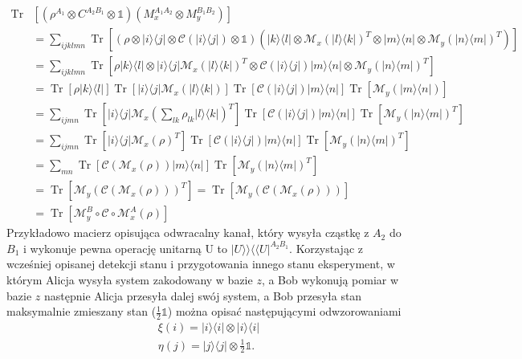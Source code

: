 \documentclass[10pt]{article} %
\DeclareMathOperator{\Trs}{Tr}
\newcommand{\Ket}[1]{|#1\rangle}
\newcommand{\Bra}[1]{\langle#1|}
\newcommand{\BBra}[1]{\langle\langle#1|}
\newcommand{\KKet}[1]{|#1\rangle\rangle}
\newcommand{\I}{\mathbb{1}}
\begin{document}
\begin{equation}
\begin{split}
\Trs&\left[ \left(\rho^{A_1} \otimes C^{A_2B_1} \otimes \I \right)\left(M_x^{A_1A_2}\otimes M_y^{B_1B_2}\right)\right] \\
&= \sum_{ijklmn} \Trs \left[ \left(\rho \otimes \Ket{i}\Bra{j} \otimes \mathcal{C}(\Ket{i}\Bra{j}) \otimes \I\right)\left(\Ket{k}\Bra{l} \otimes \mathcal{M}_x(\Ket{l}\Bra{k})^T \otimes \Ket{m}\Bra{n} \otimes \mathcal{M}_y(\Ket{n}\Bra{m})^T\right)\right] \\
&= \sum_{ijklmn} \Trs \left[ \rho \Ket{k}\Bra{l} \otimes \Ket{i}\Bra{j}\mathcal{M}_x(\Ket{l}\Bra{k})^T \otimes \mathcal{C}(\Ket{i}\Bra{j})\Ket{m}\Bra{n} \otimes \mathcal{M}_y(\Ket{n}\Bra{m})^T\right] \\
&= \Trs\left[\rho\Ket{k}\Bra{l}\right] \Trs\left[\Ket{i}\Bra{j}\mathcal{M}_x(\Ket{l}\Bra{k})\right] \Trs\left[\mathcal{C}(\Ket{i}\Bra{j}) \Ket{m}\Bra{n}\right] \Trs\left[\mathcal{M}_y(\Ket{m}\Bra{n})\right] \\
&= \sum_{ijmn}  \Trs\left[\Ket{i}\Bra{j}\mathcal{M}_x(\sum_{lk} \rho_{lk} \Ket{l}\Bra{k})^T\right] \Trs\left[\mathcal{C}(\Ket{i}\Bra{j}) \Ket{m}\Bra{n}\right] \Trs\left[\mathcal{M}_y(\Ket{n}\Bra{m})^T\right] \\
&= \sum_{ijmn}  \Trs\left[\Ket{i}\Bra{j}\mathcal{M}_x(\rho)^T\right] \Trs\left[\mathcal{C}(\Ket{i}\Bra{j}) \Ket{m}\Bra{n}\right] \Trs\left[\mathcal{M}_y(\Ket{n}\Bra{m})^T\right] \\
&= \sum_{mn} \Trs \left[ \mathcal{C}(\mathcal{M}_x(\rho))\Ket{m}\Bra{n}\right]\Trs\left[\mathcal{M}_y(\Ket{n}\Bra{m})^T\right] \\
&=  \Trs\left[ \mathcal{M}_y (\mathcal{C}(\mathcal{M}_x(\rho)))^T\right] = \Trs\left[ \mathcal{M}_y (\mathcal{C}(\mathcal{M}_x(\rho)))\right] \\
&=\Trs \left[ \mathcal{M}_y^B \circ \mathcal{C} \circ \mathcal{M}_x^A(\rho)\right]
\end{split}
\end{equation}
Przykładowo macierz opisująca odwracalny kanał, który wysyła cząstkę z $A_2$ do $B_1$ i wykonuje pewna operację unitarną U to $\KKet{U}\BBra{U}^{A_2B_1}$. Korzystając z wcześniej opisanej detekcji stanu i przygotowania innego stanu eksperyment, w którym Alicja wysyła system zakodowany w bazie $z$, a Bob wykonują pomiar w bazie $z$ następnie Alicja przesyła dalej swój system, a Bob przesyła stan maksymalnie zmieszany stan 
($\frac{1}{2}\I$) można opisać następującymi odwzorowaniami
\begin{gather}
\xi(i) = \Ket{i}\Bra{i} \otimes \Ket{i}\Bra{i} \\
\eta(j) = \Ket{j}\Bra{j} \otimes \frac{1}{2}\I.
\end{gather} 
\end{document}
